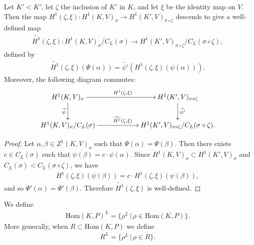 \begin{lemma} Let $K' < K'$, let $\zeta$ the inclusion of $K'$ in $K$, and let $\xi$ be the identity map on $V$. Then the map $H^1(\zeta, \xi):H^1(K, V)_\sigma \rightarrow H^1(K', V)_{\sigma\circ\zeta}$ descends to give a well-defined map
	\begin{align*}
		\widetilde{H^1}(\zeta, \xi): H^1(K, V)_\sigma/C_L(\sigma) \rightarrow H^1(K', V)_{\sigma\circ\zeta}/C_L(\sigma\circ \zeta),
	\end{align*}
defined by
	\begin{align*}
		\widetilde{H^1}(\zeta, \xi)(\Psi(\alpha)) = \widetilde{\psi'}\left(H^1(\zeta, \xi)(\psi(\alpha))\right).
	\end{align*}
Moreover, the following diagram commutes:
  \begin{align*}
    \xymatrix@C=60pt{
		H^1(K, V)_\sigma \ar[r]^{H^1(\zeta, \xi)} \ar[d]_{\widetilde{\psi}} & H^1(K', V)_{\sigma\circ\zeta} \ar[d]^{\widetilde{\psi'}} \\
		H^1(K, V)_\sigma/C_L(\sigma) \ar[r]^{\widetilde{H^1}(\zeta, \xi)} & {H^1(K', V)_{\sigma\circ\zeta}/C_L(\sigma\circ\zeta)}.
    }
  \end{align*}
\end{lemma}
\begin{proof}
	Let $\alpha, \beta \in Z^1(K, V)_\sigma$ such that $\Psi(\alpha) = \Psi(\beta)$. Then there exists $c \in C_L(\sigma)$ such that $\psi(\beta) = c \cdot \psi(\alpha)$. Since $H^1(K, V)_\sigma \subset H^1(K', V)_\sigma$ and $C_L(\sigma) < C_L(\sigma\circ\zeta)$, we have
	\begin{align*}
		H^1(\zeta, \xi)\left(\psi(\beta)\right) = c \cdot H^1(\zeta, \xi)\left(\psi(\beta)\right),
	\end{align*}
	and so $\Psi'(\alpha) = \Psi'(\beta)$. Therefore $\widetilde{H^1}(\zeta, \xi)$ is well-defined.
\end{proof}

\begin{definition} We define
	\begin{align*}
		\mathrm{Hom}(K, P)^L = \{\rho^L\,|\,\rho \in \mathrm{Hom}(K, P)\}.
	\end{align*}
	More generally, when $R \subset \mathrm{Hom}(K, P)$ we define
	\begin{align*}
		R^L = \{\rho^L\,|\,\rho \in R\}.
	\end{align*}
\end{definition}

